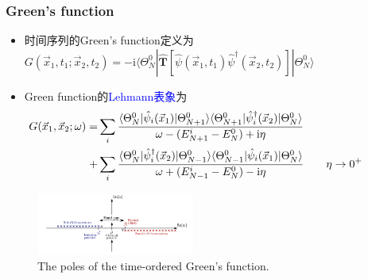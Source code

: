 \frame
{
	\frametitle{\textrm{Green's function}}
	\begin{itemize}
\vspace{-7pt}
		\item 时间序列的\textrm{Green's function}定义为$G(\vec x_1,t_1;\vec x_2,t_2)=-\mathrm{i}\langle\Theta_N^0|\hat{\mathbf{T}}[\hat\psi(\vec x_1,t_1)\hat\psi^{\dag}(\vec x_2,t_2)]|\Theta_N^0\rangle$
		\item \textrm{Green function}的\textcolor{blue}{\textrm{Lehmann}表象}为
			\begin{displaymath}
				\begin{aligned}
					\hspace*{-35pt}
					G(\vec x_1,\vec x_2;\omega)=&\sum\limits_i\dfrac{\langle\Theta_N^0|\hat\psi_i(\vec x_1)|\Theta_{N+1}^0\rangle\langle\Theta_{N+1}^0|\hat\psi_i^{\dag}(\vec x_2)|\Theta_N^0\rangle}{\omega-(E_{N+1}^i-E_N^0)+\mathrm{i}\eta}\\
					+&\sum\limits_i\dfrac{\langle\Theta_N^0|\hat\psi_i^{\dag}(\vec x_2)|\Theta_{N-1}^0\rangle\langle\Theta_{N-1}^0|\hat\psi_i(\vec x_1)|\Theta_N^0\rangle}{\omega+(E_{N-1}^i-E_N^0)-\mathrm{i}\eta}\qquad\eta\rightarrow0^+
				\end{aligned}
			\end{displaymath}
			{\fontsize{6.2pt}{6.2pt}}
	\end{itemize}
\begin{figure}[h!]
\centering
\vspace{-5pt}
\includegraphics[height=0.80in,width=2.05in,viewport=30 1 660 265,clip]{Figures/GW-0.png}
\caption{\textrm{\tiny{The poles of the time-ordered Green's function.}}}%
\label{GW-0}
\end{figure}
}

